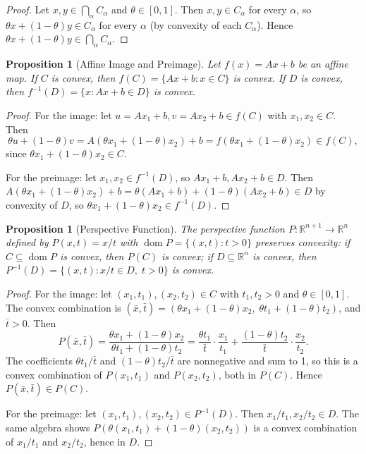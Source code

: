 \documentclass[11pt,a4paper]{article}
\newtheorem{proposition}[theorem]{Proposition}
\theoremstyle{definition}
\theoremstyle{remark}
\newcommand{\R}{\mathbb{R}}
\DeclareMathOperator{\dom}{dom}
\begin{document}
\begin{proof}
Let $x, y \in \bigcap_\alpha C_\alpha$ and $\theta \in [0,1]$. Then $x, y \in C_\alpha$
for every $\alpha$, so $\theta x + (1-\theta) y \in C_\alpha$ for every $\alpha$ (by
convexity of each $C_\alpha$). Hence $\theta x + (1-\theta) y \in \bigcap_\alpha
C_\alpha$.
\end{proof}

\begin{proposition}[Affine Image and Preimage]
\label{prop:affine-image}
Let $f(x) = Ax + b$ be an affine map. If $C$ is convex, then $f(C) = \{Ax + b : x \in
C\}$ is convex. If $D$ is convex, then $f^{-1}(D) = \{x : Ax + b \in D\}$ is convex.
\end{proposition}

\begin{proof}
For the image: let $u = Ax_1 + b, v = Ax_2 + b \in f(C)$ with $x_1, x_2 \in C$. Then
\[
  \theta u + (1-\theta)v = A(\theta x_1 + (1-\theta) x_2) + b = f(\theta x_1 +
  (1-\theta) x_2) \in f(C),
\]
since $\theta x_1 + (1-\theta) x_2 \in C$.

For the preimage: let $x_1, x_2 \in f^{-1}(D)$, so $Ax_1 + b, Ax_2 + b \in D$. Then
$A(\theta x_1 + (1-\theta) x_2) + b = \theta(Ax_1 + b) + (1-\theta)(Ax_2 + b) \in D$
by convexity of $D$, so $\theta x_1 + (1-\theta) x_2 \in f^{-1}(D)$.
\end{proof}

\begin{proposition}[Perspective Function]
\label{prop:perspective}
The \emph{perspective function} $P : \R^{n+1} \to \R^n$ defined by $P(x, t) = x/t$ with
$\dom P = \{(x,t) : t > 0\}$ preserves convexity: if $C \subseteq \dom P$ is convex,
then $P(C)$ is convex; if $D \subseteq \R^n$ is convex, then $P^{-1}(D) = \{(x,t) :
x/t \in D, \; t > 0\}$ is convex.
\end{proposition}

\begin{proof}
For the image: let $(x_1, t_1), (x_2, t_2) \in C$ with $t_1, t_2 > 0$ and
$\theta \in [0,1]$. The convex combination is $(\bar{x}, \bar{t}) = (\theta x_1 +
(1-\theta) x_2, \; \theta t_1 + (1-\theta) t_2)$, and $\bar{t} > 0$. Then
\[
  P(\bar{x}, \bar{t}) = \frac{\theta x_1 + (1-\theta) x_2}{\theta t_1 + (1-\theta) t_2}
  = \frac{\theta t_1}{\bar{t}} \cdot \frac{x_1}{t_1}
    + \frac{(1-\theta) t_2}{\bar{t}} \cdot \frac{x_2}{t_2}.
\]
The coefficients $\theta t_1 / \bar{t}$ and $(1-\theta) t_2 / \bar{t}$ are nonnegative and
sum to 1, so this is a convex combination of $P(x_1, t_1)$ and $P(x_2, t_2)$, both in
$P(C)$. Hence $P(\bar{x}, \bar{t}) \in P(C)$.

For the preimage: let $(x_1, t_1), (x_2, t_2) \in P^{-1}(D)$. Then $x_1/t_1, x_2/t_2
\in D$. The same algebra shows $P(\theta(x_1,t_1) + (1-\theta)(x_2,t_2))$ is a convex
combination of $x_1/t_1$ and $x_2/t_2$, hence in $D$.
\end{proof}
\end{document}
